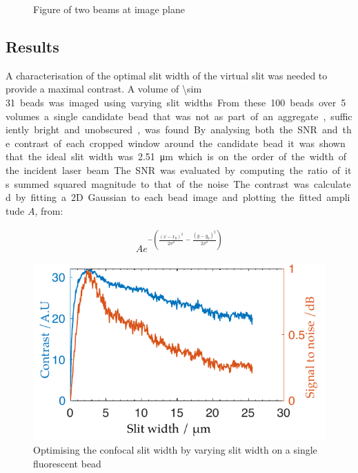 \begin{figure}
  \caption{Figure of two beams at image plane}
  \label{}
\end{figure}

\subsection{Results}

A characterisation of the optimal slit width of the virtual slit was needed to provide a maximal contrast.
A volume of \SI{\sim 31} beads was imaged using varying slit widths.
From these 100 beads over 5 volumes a single candidate bead that was not as part of an aggregate, sufficiently bright and unobscured, was found.
By analysing both the SNR and the contrast of each cropped window around the candidate bead it was shown that the ideal slit width was \SI{2.51}{\micro\metre} which is on the order of the width of the incident laser beam.
The SNR was evaluated by computing the ratio of its summed squared magnitude to that of the noise.
The contrast was calculated by fitting a 2D Gaussian to each bead image and plotting the fitted amplitude $A$, from:

\begin{align}
  A e^{-\left(\frac{(x-x_0)^2}{2\sigma^2}-\frac{(y-y_0)^2}{2\sigma^2}\right)}
\end{align}

\begin{figure}
  \centering
  \includegraphics{Chapters/dualslit/Figs/PDF/optimal_slit_snr_contrast}
  \caption{Optimising the confocal slit width by varying slit width on a single fluorescent bead}
  \label{fig:optimal_slit_snr_contrast}
\end{figure}

